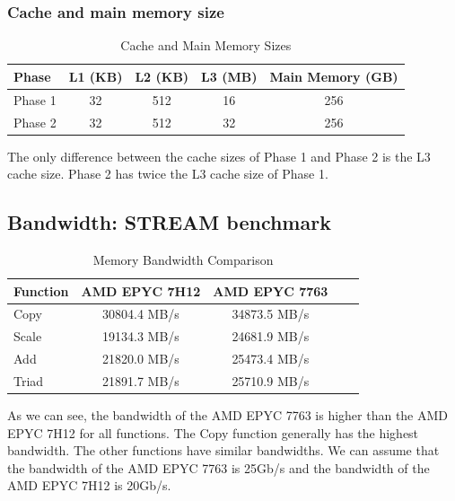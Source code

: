 \documentclass[unicode,11pt,a4paper,oneside,numbers=endperiod,openany]{scrartcl}
\begin{document}
\subsubsection{Cache and main memory size}

\begin{table}[ht]
\centering
\caption{Cache and Main Memory Sizes}
\begin{tabular}{|l|c|c|c|c|}
\hline
\textbf{Phase} & \textbf{L1 (KB)} & \textbf{L2 (KB)} & \textbf{L3 (MB)} & \textbf{Main Memory (GB)} \\ \hline
Phase 1        & 32               & 512              & 16               & 256                      \\ \hline
Phase 2        & 32               & 512              & 32               & 256                      \\ \hline
\end{tabular}
\end{table}

The only difference between the cache sizes of Phase 1 and Phase 2 is the L3 cache size. 
Phase 2 has twice the L3 cache size of Phase 1.

\subsection{Bandwidth: STREAM benchmark}

\begin{table}[ht]
\centering
\caption{Memory Bandwidth Comparison}
\begin{tabular}{|l|c|c|c|c|}
\hline
\textbf{Function} & \textbf{AMD EPYC 7H12} & \textbf{AMD EPYC 7763} \\ \hline
Copy              & 30804.4 MB/s           & 34873.5 MB/s           \\ \hline
Scale             & 19134.3 MB/s           & 24681.9 MB/s           \\ \hline
Add               & 21820.0 MB/s           & 25473.4 MB/s           \\ \hline
Triad             & 21891.7 MB/s           & 25710.9 MB/s           \\ \hline
\end{tabular}
\end{table}

As we can see, the bandwidth of the AMD EPYC 7763 is higher than the AMD EPYC 7H12 for all functions.
The Copy function generally has the highest bandwidth. The other functions have similar bandwidths.
We can assume that the bandwidth of the AMD EPYC 7763 is 25Gb/s and the bandwidth of the AMD EPYC 7H12 is 20Gb/s.
\end{document}
